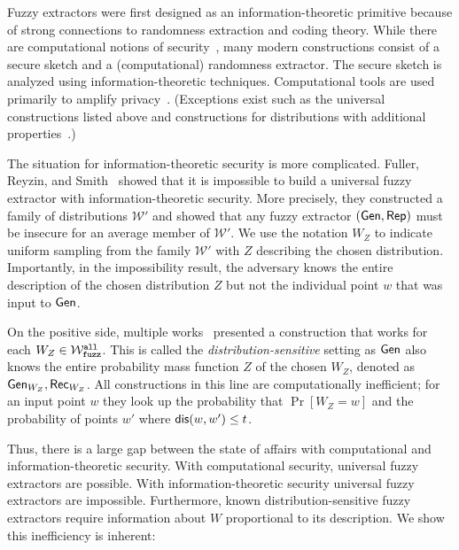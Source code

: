Fuzzy extractors were first designed as an information-theoretic primitive because of strong connections to randomness extraction and coding theory.  While there are computational notions of security~\cite{fuller2020computational}, many modern constructions consist of a secure sketch and a (computational) randomness extractor.  The secure sketch is analyzed using information-theoretic techniques.  Computational tools are used primarily to amplify privacy~\cite{wen2018robustly,wen2019generic}.  (Exceptions exist such as the universal constructions listed above and constructions for distributions with additional properties~\cite{apon2017efficient,alamelou2018pseudoentropic,fuller2020computational,canetti2021reusable}.)

The situation for information-theoretic security is more complicated.  Fuller, Reyzin, and Smith~\cite{fuller2020fuzzy} showed that it is impossible to build a universal fuzzy extractor with information-theoretic security.  More precisely, they constructed a family of distributions $\mathcal{W}'$ and showed that any fuzzy extractor $({\mathsf{Gen}}, {\mathsf{Rep}})$ must be insecure for an average member of $\mathcal{W}'$. We use the notation $W_Z$ to indicate uniform sampling from the family $\mathcal{W}'$ with $Z$ describing the chosen distribution.  Importantly, in the impossibility result, the adversary knows the entire description of the chosen distribution $Z$ but not the individual point $w$ that was input to ${\mathsf{Gen}}$.

On the positive side, multiple works~\cite{hayashi2014secret,hayashi2016secret,fuller2016fuzzy,woodage2017new,tyagi2017universal,TVW18,LA18,fuller2019continuous,fuller2020fuzzy} presented a construction that works for each $W_Z\in \mathcal{W}_{\mathtt{fuzz}}^{\mathtt{all}}$.  This is called the \emph{distribution-sensitive} setting as ${\mathsf{Gen}}$ also knows the entire probability mass function $Z$ of the chosen $W_Z$, denoted as ${\mathsf{Gen}}_{W_Z}, {\mathsf{Rec}}_{W_Z}$.  All constructions in this line are computationally inefficient; for an input point $w$ they look up the probability that $\Pr[W_Z=w]$ and the probability of points $w'$ where $\mathsf{dis}(w, w')\le t$.  

Thus, there is a large gap between the state of affairs with computational and information-theoretic security.  With computational security, universal fuzzy extractors are possible.  With information-theoretic security universal fuzzy extractors are impossible.  Furthermore, known distribution-sensitive fuzzy extractors require information about $W$ proportional to its description.  We show this inefficiency is inherent:

